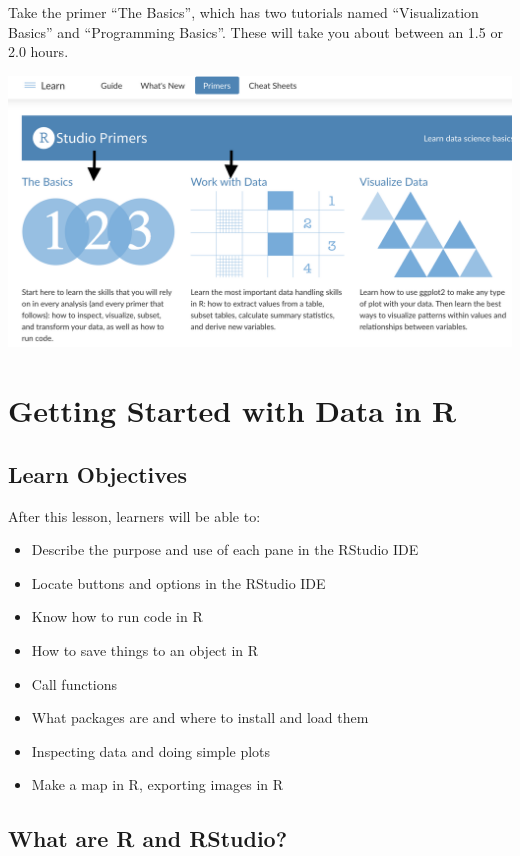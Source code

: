 \documentclass[]{book}
\providecommand{\tightlist}{%
  \setlength{\itemsep}{0pt}\setlength{\parskip}{0pt}}
\begin{document}
Take the primer ``The Basics'', which has two tutorials named ``Visualization Basics'' and ``Programming Basics''. These will take you about between an 1.5 or 2.0 hours.

\includegraphics[width=400pt]{images/primers-todo}

\hypertarget{getting-started}{%
\chapter{Getting Started with Data in R}\label{getting-started}}

\hypertarget{learn-objectives}{%
\section{Learn Objectives}\label{learn-objectives}}

After this lesson, learners will be able to:

\begin{itemize}
\tightlist
\item
  Describe the purpose and use of each pane in the RStudio IDE
\item
  Locate buttons and options in the RStudio IDE
\item
  Know how to run code in R
\item
  How to save things to an object in R
\item
  Call functions
\item
  What packages are and where to install and load them
\item
  Inspecting data and doing simple plots
\item
  Make a map in R, exporting images in R
\end{itemize}

\hypertarget{r-rstudio}{%
\section{What are R and RStudio?}\label{r-rstudio}}
\end{document}
